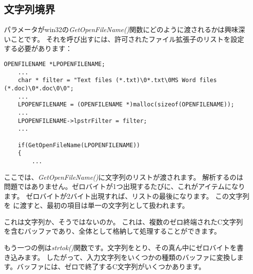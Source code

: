 ﻿\subsection{文字列境界}

パラメータがwin32の\emph{GetOpenFileName()}関数にどのように渡されるかは興味深いことです。 
それを呼び出すには、許可されたファイル拡張子のリストを設定する必要があります：

\begin{lstlisting}[style=customc]
	OPENFILENAME *LPOPENFILENAME;
	...
	char * filter = "Text files (*.txt)\0*.txt\0MS Word files (*.doc)\0*.doc\0\0";
	...
	LPOPENFILENAME = (OPENFILENAME *)malloc(sizeof(OPENFILENAME));
	...
	LPOPENFILENAME->lpstrFilter = filter;
	...

	if(GetOpenFileName(LPOPENFILENAME))
	{
		...
\end{lstlisting}

ここでは、\emph{GetOpenFileName()}に文字列のリストが渡されます。 
解析するのは問題ではありません。ゼロバイトが1つ出現するたびに、これがアイテムになります。 
ゼロバイトが2バイト出現すれば、リストの最後になります。 
この文字列を \printf に渡すと、最初の項目は単一の文字列として扱われます。

これは文字列か、そうではないのか。
これは、複数のゼロ終端されたC文字列を含むバッファであり、全体として格納して処理することができます。

もう一つの例は\emph{strtok()}関数です。文字列をとり、その真ん中にゼロバイトを書き込みます。 
したがって、入力文字列をいくつかの種類のバッファに変換します。バッファには、ゼロで終了するC文字列がいくつかあります。
